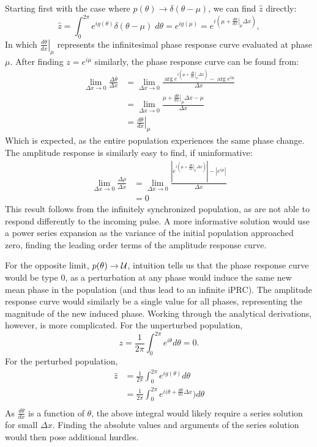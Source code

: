 Starting first with the case where $p(\theta) \to \delta(\theta - \mu)$, we can find $\hat{z}$ directly:
\[
  \hat{z} =  \int_0^{2\pi} e^{i g(\theta)} \delta(\theta - \mu) \; d\theta = e^{i g(\mu)} = e^{i(\mu + \left.\frac{d\theta}{dx}\right|_\mu \Delta x)},
\]
In which $\left.\frac{d\theta}{dx}\right|_\mu$ represents the infinitesimal phase response curve evaluated at phase $\mu$.
After finding $z = e^{i \mu}$ similarly, the phase response curve can be found from:
\begin{align*}
  \lim_{\Delta x \to 0} \frac{\Delta \bar{\theta}}{\Delta x} &= \lim_{\Delta x \to 0} \frac{\arg e^{i(\mu + \left.\frac{d\theta}{dx}\right|_\mu \Delta x)} - \arg e^{i\mu}}{\Delta x} \\
  &= \lim_{\Delta x \to 0} \frac{\mu + \left.\frac{d\theta}{dx}\right|_\mu \Delta x - \mu}{\Delta x} \\
  &= \left.\frac{d\theta}{dx}\right|_\mu
\end{align*}
Which is expected, as the entire population experiences the same phase change.
The amplitude response is similarly easy to find, if uninformative:
\begin{align*}
  \lim_{\Delta x \to 0} \frac{\Delta \rho}{\Delta x} &= \lim_{\Delta x \to 0} \frac{\left| e^{i(\mu + \left.\frac{d\theta}{dx}\right|_\mu \Delta x)}\right| - \left| e^{i\mu}\right|}{\Delta x} \\
 &= 0
\end{align*}
This result follows from the infinitely synchronized population, as are not able to respond differently to the incoming pulse.
A more informative solution would use a power series expansion as the variance of the initial population approached zero, finding the leading order terms of the amplitude response curve.

For the opposite limit, $p(\theta) \to {\cal U}$, intuition tells us that the phase response curve would be type 0, as a perturbation at any phase would induce the same new mean phase in the population (and thus lead to an infinite iPRC).
The amplitude response curve would similarly be a single value for all phases, representing the magnitude of the new induced phase.
Working through the analytical derivations, however, is more complicated.
For the unperturbed population,
\[
  z = \frac{1}{2\pi}\int_0^{2\pi} e^{i\theta} d\theta = 0.
\]
For the perturbed population, 
\begin{align*}
  \hat{z} &= \frac{1}{2\pi}\int_0^{2\pi} e^{ig(\theta)} d\theta\\
  &= \frac{1}{2\pi}\int_0^{2\pi} e^{i(\theta + \frac{d\theta}{dx}\Delta x}) d\theta\\ 
\end{align*}
As $\frac{d\theta}{dx}$ is a function of $\theta$, the above integral would likely require a series solution for small $\Delta x$.
Finding the absolute values and arguments of the series solution would then pose additional hurdles.


